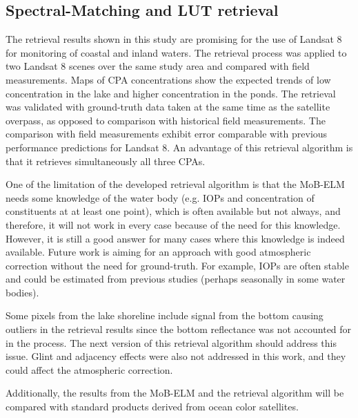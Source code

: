 \subsection{Spectral-Matching and LUT retrieval}
The retrieval results shown in this study are promising for the use of Landsat 8 for monitoring of coastal and inland waters. The retrieval process was applied to two Landsat 8 scenes over the same study area and compared with field measurements. Maps of CPA concentrations show the expected trends of low concentration in the lake and higher concentration in the ponds. The retrieval was validated with ground-truth data taken at the same time as the satellite overpass, as opposed to comparison with historical field measurements. The comparison with field measurements exhibit error comparable with previous performance predictions for Landsat 8. An advantage of this retrieval algorithm is that it retrieves simultaneously all three CPAs.




One of the limitation of the developed retrieval algorithm is that the MoB-ELM needs some knowledge of the water body (e.g. IOPs and concentration of constituents at at least one point), which is often available but not always, and therefore, it will not work in every case because of the need for this knowledge. However, it is still a good answer for many cases where this knowledge is indeed available. Future work is aiming for an approach with good atmospheric correction without the need for ground-truth. For example, IOPs are often stable and could be estimated from previous studies (perhaps seasonally in some water bodies).

Some pixels from the lake shoreline include signal from the bottom causing outliers in the retrieval results since the bottom reflectance was not accounted for in the process. The next version of this retrieval algorithm should address this issue. Glint and adjacency effects were also not addressed in this work, and they could affect the atmospheric correction.



Additionally, the results from the MoB-ELM and the retrieval algorithm will be compared with standard products derived from ocean color satellites.

